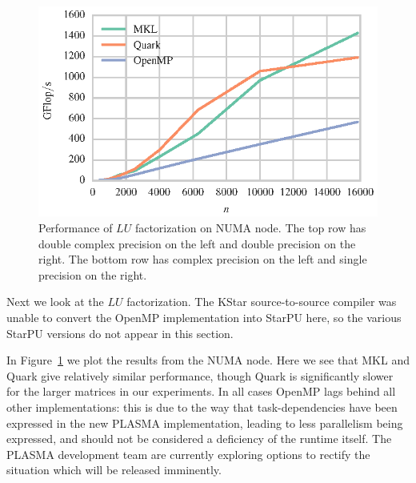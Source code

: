 \documentclass[a4paper,12pt]{article}
\begin{document}
\begin{figure}[t]
  \includegraphics[scale=.85]{fig/kebnekaise_sgetrf_weak_scaling.eps}
  \caption{Performance of $LU$ factorization on NUMA node.
    The top row has double complex precision on the left and double
    precision on the right.
    The bottom row has complex precision on the left and single
    precision on the right.}
  \label{fig.lu_numa}
\end{figure}

Next we look at the $LU$ factorization.
The KStar source-to-source compiler was unable to convert
the OpenMP implementation into StarPU here,
so the various StarPU versions do not appear in this section.

In Figure~\ref{fig.lu_numa} we plot the results from the NUMA node.
Here we see that MKL and Quark give
relatively similar performance,
though Quark is significantly slower for the larger matrices in our
experiments.
In all cases OpenMP lags behind all other implementations:
this is due to the way that task-dependencies have been expressed
in the new PLASMA implementation,
leading to less parallelism being expressed,
and should not be considered a deficiency of the runtime itself.
The PLASMA development team are currently exploring options
to rectify the situation which will be released imminently.
\end{document}

